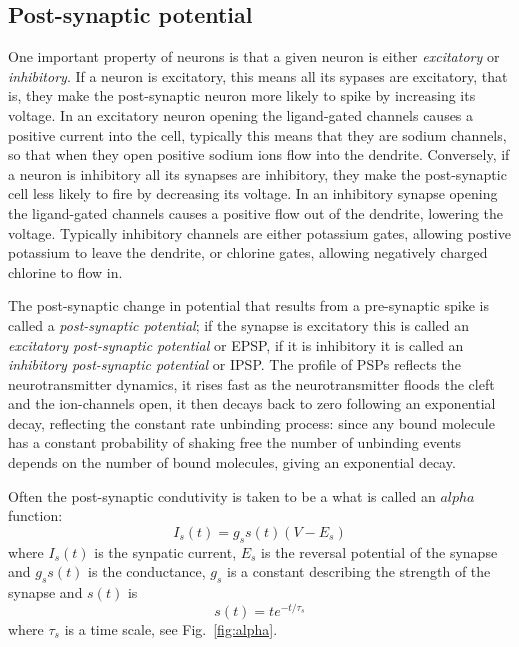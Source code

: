 \documentclass[11pt,a4paper]{scrartcl}
\begin{document}
\subsection*{Post-synaptic potential}

One important property of neurons is that a given neuron is either
\textsl{excitatory} or \textsl{inhibitory}. If a neuron is excitatory,
this means all its sypases are excitatory, that is, they make the
post-synaptic neuron more likely to spike by increasing its
voltage. In an excitatory neuron opening the ligand-gated channels
causes a positive current into the cell, typically this means that
they are sodium channels, so that when they open positive sodium ions
flow into the dendrite. Conversely, if a neuron is inhibitory all its
synapses are inhibitory, they make the post-synaptic cell less likely
to fire by decreasing its voltage. In an inhibitory synapse opening
the ligand-gated channels causes a positive flow out of the dendrite,
lowering the voltage. Typically inhibitory channels are either
potassium gates, allowing postive potassium to leave the dendrite, or
chlorine gates, allowing negatively charged chlorine to flow in. 

The post-synaptic change in potential that results from a pre-synaptic
spike is called a \textsl{post-synaptic potential}; if the synapse is
excitatory this is called an \textsl{excitatory post-synaptic
  potential} or EPSP, if it is inhibitory it is called an
\textsl{inhibitory post-synaptic potential} or IPSP. The profile of
PSPs reflects the neurotransmitter dynamics, it rises fast as the
neurotransmitter floods the cleft and the ion-channels open, it then
decays back to zero following an exponential decay, reflecting the
constant rate unbinding process: since any bound molecule has a
constant probability of shaking free the number of unbinding events
depends on the number of bound molecules, giving an exponential
decay. 

Often the post-synaptic condutivity is taken to be a what is called an
$alpha$ function:
\begin{equation}
I_s(t)=g_ss(t)(V-E_s)
\end{equation}
where $I_s(t)$ is the synpatic current, $E_s$ is the reversal
potential of the synapse and $g_ss(t)$ is the conductance, $g_s$ is a
constant describing the strength of the synapse and $s(t)$ is 
\begin{equation}
s(t)=te^{-t/\tau_s}
\end{equation}
where $\tau_s$ is a time scale, see Fig.~\ref{fig:alpha}.
\end{document}
